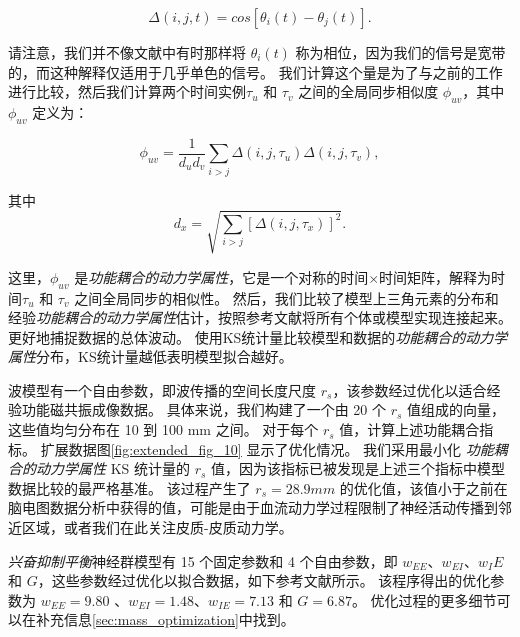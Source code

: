 \documentclass[lang=cn,a4paper,newtx,citestyle=gb7714-2015, bibstyle=gb7714-2015]{elegantpaper}
\begin{document}
\begin{equation}\label{eq:synchrony}
	\Delta(i,j,t) = cos [\theta_i (t) - \theta_j (t)].
\end{equation}

请注意，我们并不像文献中有时那样将 $ \theta_i(t) $ 称为相位，因为我们的信号是宽带的，而这种解释仅适用于几乎单色的信号。
我们计算这个量是为了与之前的工作进行比较\cite{deco2021dynamical,aquino2022intersection}，然后我们计算两个时间实例$ \tau_u $ 和 $ \tau_v $ 之间的全局同步相似度 $ \phi_{uv} $，其中 $ \phi_{uv} $ 定义为：

\begin{equation}\label{eq:synchrony_similarity}
	\phi_{uv} = \frac{1}{d_u d_v} 
				\sum_{i>j} \Delta(i,j,\tau_u) \Delta(i,j,\tau_v),
\end{equation}

其中
\begin{equation}\label{key}
	d_x = \sqrt{\sum_{i>j}
					[
					\Delta(i,j,\tau_x)
					]^2
				}.
\end{equation}

这里，$ \phi_{uv} $ 是\textit{功能耦合的动力学属性}，它是一个对称的时间$ \times $时间矩阵，解释为时间$ \tau_u $ 和 $ \tau_v $ 之间全局同步的相似性。
然后，我们比较了模型上三角元素的分布和经验\textit{功能耦合的动力学属性}估计，按照参考文献将所有个体或模型实现连接起来\cite{aquino2022intersection}。
更好地捕捉数据的总体波动。
使用KS统计量比较模型和数据的\textit{功能耦合的动力学属性}分布，KS统计量越低表明模型拟合越好。


波模型有一个自由参数，即波传播的空间长度尺度 $ r_s $，该参数经过优化以适合经验功能磁共振成像数据。
具体来说，我们构建了一个由 20 个 $ r_s $ 值组成的向量，这些值均匀分布在 10 到 100 mm 之间。
对于每个 $ r_s $ 值，计算上述功能耦合指标。
扩展数据图\ref{fig:extended_fig_10} 显示了优化情况。
我们采用最小化 \textit{功能耦合的动力学属性} KS 统计量的 $ r_s $ 值，因为该指标已被发现是上述三个指标中模型数据比较的最严格基准\cite{aquino2022intersection}。
该过程产生了 $ r_s = 28.9 mm $ 的优化值，该值小于之前在脑电图数据分析中获得的值\cite{robinson2005multiscale}，可能是由于血流动力学过程限制了神经活动传播到邻近区域，或者我们在此关注皮质-皮质动力学\cite{aquino2012hemodynamic,pang2017effects}。


\textit{兴奋抑制平衡}神经群模型有 15 个固定参数和 4 个自由参数，即 $ w_{EE} $、$ w_{EI} $、$ w_IE $ 和 $ G $，这些参数经过优化以拟合数据，如下参考文献\cite{demirtacs2019hierarchical}所示。
该程序得出的优化参数为 $ w_{EE} = 9.80 $ 、$ w_{EI} = 1.48 $、$ w_{IE} = 7.13 $ 和 $ G = 6.87 $。
优化过程的更多细节可以在补充信息\ref{sec:mass_optimization}中找到。
\end{document}
